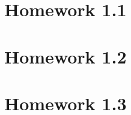 \documentclass[11pt, a4paper]{article}
\begin{document}
 
    



%
\tableofcontents

\clearpage
    
\section{Homework 1.1}      
\label{sec:1.1} 


\section{Homework 1.2}
\label{sec:1.2}


\section{Homework 1.3}
\label{sec:1.3}


    
\end{document}
